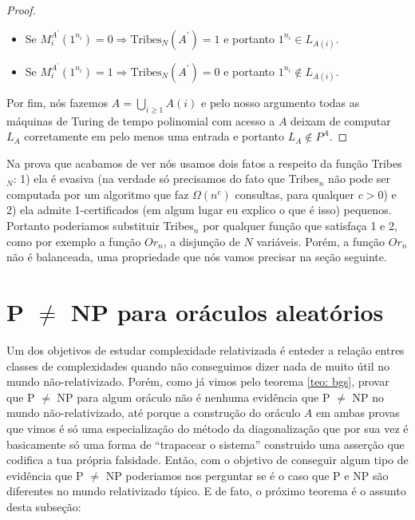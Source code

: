 \begin{proof}
\begin{itemize}
    \item Se $M_{i}^{A^{\prime}}(1^{n_{i}}) = 0 \Rightarrow \text{Tribes}_{N}(A^{\prime}) = 1$ e portanto $1^{n_{i}} \in L_{A(i)}$.

    \item Se $M_{i}^{A^{\prime}}(1^{n_{i}}) = 1 \Rightarrow \text{Tribes}_{N}(A^{\prime}) = 0$ e portanto $1^{n_{i}} \notin L_{A(i)}$.

\end{itemize}

    Por fim, nós fazemos $A = \bigcup_{i \geq 1}A(i)$ e pelo nosso argumento todas as máquinas de Turing de tempo polinomial com acesso a $A$ deixam de computar $L_{A}$ corretamente em pelo menos uma entrada e portanto $L_{A} \notin P^{A}$.

\end{proof}

Na prova que acabamos de ver nós usamos dois fatos a respeito da função Tribes$_{N}$: 1) ela é evasiva (na verdade só precisamos do fato que Tribes$_{n}$ não pode ser computada por um algoritmo que faz $\Omega(n^{c})$ consultas, para qualquer $c > 0$) e 2) ela admite 1-certificados (em algum lugar eu explico o que é isso) pequenos. Portanto poderiamos substituir Tribes$_{n}$ por qualquer função que satisfaça 1 e 2, como por exemplo a função $Or_{n}$, a disjunção de $N$ variáveis. Porém, a função $Or_{n}$ não é balanceada, uma propriedade que nós vamos precisar na seção seguinte.

\section{P $\neq$ NP para oráculos aleatórios}

Um dos objetivos de estudar complexidade relativizada é enteder a relação entres classes de complexidades quando não conseguimos dizer nada de muito útil no mundo não-relativizado. Porém, como já vimos pelo teorema \ref{teo: bgs}, provar que P $\neq$ NP para algum oráculo não é nenhuma evidência que P $\neq$ NP no mundo não-relativizado, até porque a construção do oráculo $A$ em ambas provas que vimos é só uma especialização do método da diagonalização que por sua vez é basicamente só uma forma de ``trapacear o sistema'' construido uma asserção que codifica a tua própria falsidade. Então, com o objetivo de conseguir algum tipo de evidência que P $\neq$ NP poderiamos nos perguntar se é o caso que P e NP são diferentes no mundo relativizado típico. E de fato, o próximo teorema é o assunto desta subseção:

